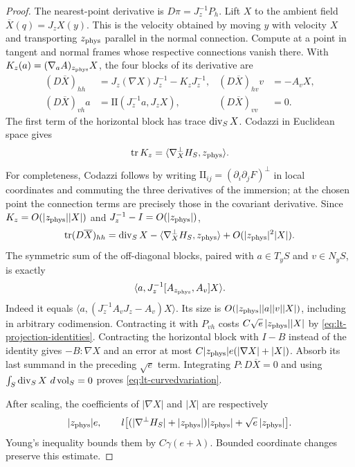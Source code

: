 \begin{proof}
The nearest-point derivative is $D\pi=J_z^{-1}P_h$.  Lift $X$ to the ambient
field $\overline X(q)=J_zX(y)$.  This is the velocity obtained by moving $y$
with velocity $X$ and transporting $z_{\rm phys}$ parallel in the normal
connection.  Compute at a point in tangent and normal frames whose respective
connections vanish there.  With
$K_z(a)=(\nabla_a A)_{z_{\rm phys}}X$, the four blocks of its derivative are
\begin{align*}
 (D\overline X)_{hh}&=J_z(\nabla X)J_z^{-1}-K_zJ_z^{-1},&
 (D\overline X)_{hv}v&=-A_vX,\\
 (D\overline X)_{vh}a&=\mathrm{II}(J_z^{-1}a,J_zX),&
 (D\overline X)_{vv}&=0.
\end{align*}
The first term of the horizontal block has trace $\operatorname{div}_SX$.  Codazzi in
Euclidean space gives
\[
 \operatorname{tr} K_z=\langle\nabla_X^\perp H_S,z_{\rm phys}\rangle.
\]
For completeness, Codazzi follows by writing
$\mathrm{II}_{ij}=(\partial_i\partial_jF)^\perp$ in local coordinates and
commuting the three derivatives of the immersion; at the chosen point the
connection terms are precisely those in the covariant derivative.
Since $K_z=O(|z_{\rm phys}||X|)$ and $J_z^{-1}-I=O(|z_{\rm phys}|)$,
\[
 \operatorname{tr}(D\overline X)_{hh}
 =\operatorname{div}_SX-\langle\nabla_X^\perp H_S,z_{\rm phys}\rangle
       +O(|z_{\rm phys}|^2|X|).
\]
The symmetric sum of the off-diagonal blocks, paired with $a\in T_yS$ and
$v\in N_yS$, is exactly
\[
 \langle a,J_z^{-1}[A_{z_{\rm phys}},A_v]X\rangle.
\]
Indeed it equals
$\langle a,(J_z^{-1}A_vJ_z-A_v)X\rangle$.
Its size is $O(|z_{\rm phys}||a||v||X|)$, including in arbitrary codimension.
Contracting it with $P_{vh}$ costs
$C\sqrt e\,|z_{\rm phys}||X|$ by
\eqref{eq:lt-projection-identities}.  Contracting the horizontal block with
$I-B$ instead of the identity gives $-B:\nabla X$ and an error at most
$C|z_{\rm phys}|e(|\nabla X|+|X|)$.  Absorb its last summand in the
preceding $\sqrt e$ term.  Integrating $P:D\overline X=0$ and using
$\int_S\operatorname{div}_SX\,\mathop{}\!d\operatorname{vol}_S=0$ proves
\eqref{eq:lt-curvedvariation}.

After scaling, the coefficients of $|\nabla X|$ and $|X|$ are respectively
\[
 |z_{\rm phys}|e,\qquad
 l\big[(|\nabla^\perp H_S|+|z_{\rm phys}|)|z_{\rm phys}|
                         +\sqrt e\,|z_{\rm phys}|\big].
\]
Young's inequality bounds them by $C\gamma(e+\lambda)$.  Bounded coordinate
changes preserve this estimate.
\end{proof}

